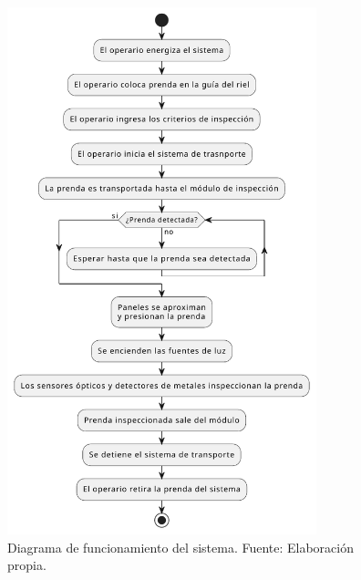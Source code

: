 \begin{figure}[H]
	\centering
	\includegraphics[width=0.8\textwidth]{img/diagrama_flujo.pdf}
	\caption[Diagrama de funcionamiento del sistema.]{Diagrama de funcionamiento del sistema. Fuente: Elaboración propia.}
	\label{fig:diagrama_flujo}
\end{figure}
